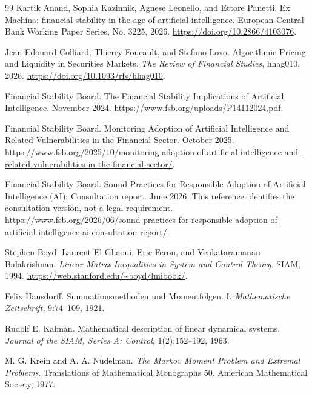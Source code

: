 \documentclass[10pt,twocolumn,letterpaper]{article}
\theoremstyle{definition}
\theoremstyle{remark}
\begin{document}
\begin{thebibliography}{99}
Kartik Anand, Sophia Kazinnik, Agnese Leonello, and Ettore Panetti.
\newblock Ex Machina: financial stability in the age of artificial intelligence.
\newblock European Central Bank Working Paper Series, No. 3225, 2026.
\newblock \url{https://doi.org/10.2866/4103076}.

Jean-Edouard Colliard, Thierry Foucault, and Stefano Lovo.
\newblock Algorithmic Pricing and Liquidity in Securities Markets.
\newblock \emph{The Review of Financial Studies}, hhag010, 2026.
\newblock \url{https://doi.org/10.1093/rfs/hhag010}.

Financial Stability Board.
\newblock The Financial Stability Implications of Artificial Intelligence.
 November 2024.
\newblock \url{https://www.fsb.org/uploads/P14112024.pdf}.

Financial Stability Board.
\newblock Monitoring Adoption of Artificial Intelligence and Related Vulnerabilities in the Financial Sector.
 October 2025.
\newblock \url{https://www.fsb.org/2025/10/monitoring-adoption-of-artificial-intelligence-and-related-vulnerabilities-in-the-financial-sector/}.

Financial Stability Board.
\newblock Sound Practices for Responsible Adoption of Artificial Intelligence (AI): Consultation report.
 June 2026. This reference identifies the consultation version, not a legal requirement.
\newblock \url{https://www.fsb.org/2026/06/sound-practices-for-responsible-adoption-of-artificial-intelligence-ai-consultation-report/}.

Stephen Boyd, Laurent El Ghaoui, Eric Feron, and Venkataramanan Balakrishnan.
\newblock \emph{Linear Matrix Inequalities in System and Control Theory}.
\newblock SIAM, 1994.
\newblock \url{https://web.stanford.edu/~boyd/lmibook/}.

Felix Hausdorff.
\newblock Summationsmethoden und Momentfolgen. I.
\newblock \emph{Mathematische Zeitschrift}, 9:74--109, 1921.

Rudolf E. Kalman.
\newblock Mathematical description of linear dynamical systems.
\newblock \emph{Journal of the SIAM, Series A: Control}, 1(2):152--192, 1963.

M. G. Krein and A. A. Nudelman.
\newblock \emph{The Markov Moment Problem and Extremal Problems}.
\newblock Translations of Mathematical Monographs 50. American Mathematical Society, 1977.


\end{thebibliography}
\end{document}
